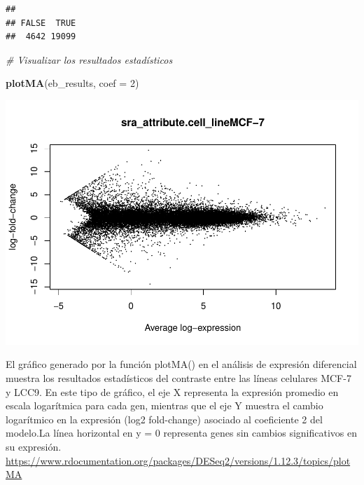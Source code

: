 \documentclass[
]{article}
\newenvironment{Shaded}{\begin{snugshade}}{\end{snugshade}}
\newcommand{\AttributeTok}[1]{\textcolor[rgb]{0.13,0.29,0.53}{#1}}
\newcommand{\CommentTok}[1]{\textcolor[rgb]{0.56,0.35,0.01}{\textit{#1}}}
\newcommand{\DecValTok}[1]{\textcolor[rgb]{0.00,0.00,0.81}{#1}}
\newcommand{\FunctionTok}[1]{\textcolor[rgb]{0.13,0.29,0.53}{\textbf{#1}}}
\newcommand{\NormalTok}[1]{#1}
\newcommand{\SpecialCharTok}[1]{\textcolor[rgb]{0.81,0.36,0.00}{\textbf{#1}}}
\begin{document}
\begin{verbatim}
## 
## FALSE  TRUE 
##  4642 19099
\end{verbatim}

\begin{Shaded}
\begin{Highlighting}[]
\CommentTok{\# Visualizar los resultados estadísticos}

\FunctionTok{plotMA}\NormalTok{(eb\_results, }\AttributeTok{coef =} \DecValTok{2}\NormalTok{)}
\end{Highlighting}
\end{Shaded}

\includegraphics{Proyecto_RNAseq_files/figure-latex/unnamed-chunk-14-1.pdf}

El gráfico generado por la función plotMA() en el análisis de expresión
diferencial muestra los resultados estadísticos del contraste entre las
líneas celulares MCF-7 y LCC9. En este tipo de gráfico, el eje X
representa la expresión promedio en escala logarítmica para cada gen,
mientras que el eje Y muestra el cambio logarítmico en la expresión
(log2 fold-change) asociado al coeficiente 2 del modelo.La línea
horizontal en y = 0 representa genes sin cambios significativos en su
expresión.
\url{https://www.rdocumentation.org/packages/DESeq2/versions/1.12.3/topics/plotMA}

\begin{Shaded}
\end{Shaded}
\end{document}

